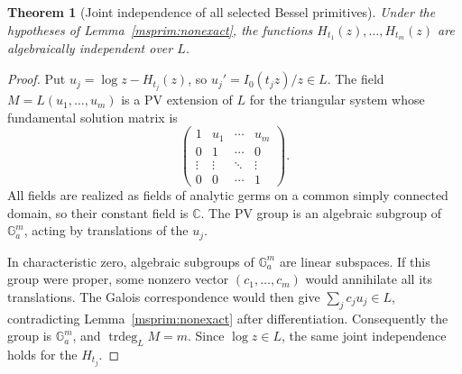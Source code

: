 \documentclass[11pt]{article}
\newtheorem{theorem}{Theorem}[section]
\theoremstyle{definition}
\theoremstyle{remark}
\begin{document}
\begin{theorem}[Joint independence of all selected Bessel primitives]
\label{msprim:functional}
Under the hypotheses of Lemma~\ref{msprim:nonexact}, the functions
$H_{t_1}(z),\ldots,H_{t_m}(z)$ are algebraically independent over $L$.
\end{theorem}
\begin{proof}
Put $u_j=\log z-H_{t_j}(z)$, so $u_j'=I_0(t_jz)/z\in L$.
The field $M=L(u_1,\ldots,u_m)$ is a PV extension of $L$ for the
triangular system whose fundamental solution matrix is
\[
 \begin{pmatrix}1&u_1&\cdots&u_m\\
 0&1&\cdots&0\\[-2pt]
 \vdots&\vdots&\ddots&\vdots\\
 0&0&\cdots&1\end{pmatrix}.
\]
All fields are realized as fields of analytic germs on a common
simply connected domain, so their constant field is $\mathbb C$.
The PV group is an algebraic subgroup of $\mathbb G_a^m$, acting
by translations of the $u_j$.

In characteristic zero, algebraic subgroups of $\mathbb G_a^m$ are
linear subspaces. If this group were proper, some nonzero vector
$(c_1,\ldots,c_m)$ would annihilate all its translations. The
Galois correspondence would then give
$\sum_jc_ju_j\in L$, contradicting
Lemma~\ref{msprim:nonexact} after differentiation.
Consequently the group is $\mathbb G_a^m$, and
$\operatorname{trdeg}_L M=m$. Since $\log z\in L$, the same joint
independence holds for the $H_{t_j}$.
\end{proof}
\end{document}
